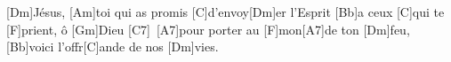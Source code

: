 [Dm]Jésus, [Am]toi qui as promis [C]d'envoy[Dm]er l'Esprit
[Bb]a ceux [C]qui te [F]prient, ô [Gm]Dieu [C7]\  [A7]pour porter au [F]mon[A7]de ton [Dm]feu,
[Bb]voici l'offr[C]ande de nos [Dm]vies. 
